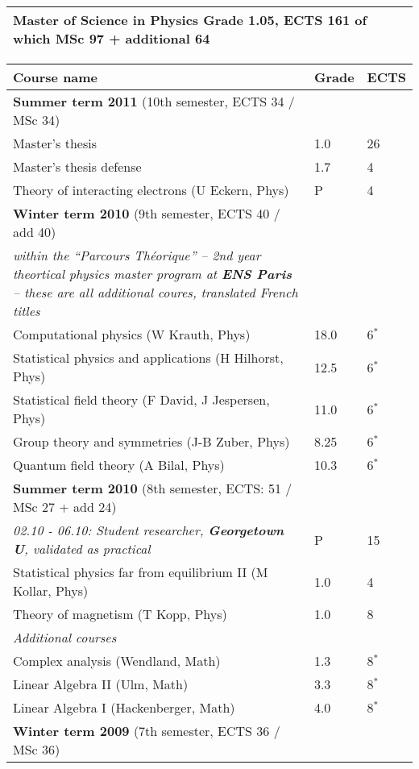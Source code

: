 {\noindent \begin{longtable}[t]{p{}}
\textbf{\normalsize{Master of Science in Physics}}
Grade 1.05, ECTS 161 of which MSc 97 + additional 64
\\ \hline \hline
\end{longtable}
\vspace{-2em}\noindent \begin{longtable}[t]{p{\widthA} p{\widthB} p{\widthC}}
Course name
& Grade
& ECTS \\ \hline
\textbf{Summer term 2011} (10th semester, ECTS 34 / MSc 34)\\
Master's thesis
& 1.0
& 26\\
Master's thesis defense
& 1.7
& 4\\
Theory of interacting electrons (U Eckern, Phys)
& P
& 4\\
 \hline
\textbf{Winter term 2010} (9th semester, ECTS 40 / add 40)\\
\textit{within the ``Parcours Th\'eorique'' -- 2nd year theortical physics master program at \textbf{ENS Paris}} \textit{-- these are all additional coures, translated French titles}\\
Computational physics (W Krauth, Phys)
& 18.0\footnotemark[4]
& 6$^*$\\
Statistical physics and applications (H Hilhorst, Phys)
& 12.5
& 6$^*$\\
Statistical field theory (F David, J Jespersen, Phys)
& 11.0
& 6$^*$\\
Group theory and symmetries (J-B Zuber, Phys)
& 8.25
& 6$^*$\\
Quantum field theory (A Bilal, Phys)
& 10.3 
& 6$^*$\\
\hline
\textbf{Summer term 2010} (8th semester, ECTS: 51 / MSc 27 + add 24)\\
\textit{02.10 - 06.10: Student researcher, \textbf{Georgetown U}, validated as practical }
& P
& 15 \\
Statistical physics far from equilibrium II  (M Kollar, Phys)
& 1.0
& 4\\
Theory of magnetism (T Kopp, Phys)
& 1.0
& 8\\
\textit{Additional courses}\\
Complex analysis (Wendland, Math)
& 1.3
& 8$^*$\\
Linear Algebra II (Ulm, Math)
& 3.3
& 8$^*$\\
Linear Algebra I (Hackenberger, Math)
& 4.0
& 8$^*$\\
 \hline
\textbf{Winter term 2009} (7th semester, ECTS 36 / MSc 36)\\

\end{longtable}}
